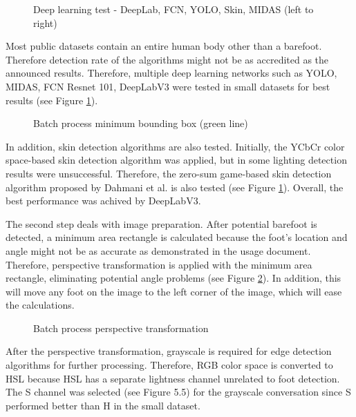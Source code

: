\begin{figure}[htbp]
\centering
{}
\caption{Deep learning test - DeepLab, FCN, YOLO, Skin, MIDAS (left to right)}
\label{fig:DeepLearningTest}
\end{figure}

Most public datasets contain an entire human body other than a barefoot. Therefore detection rate of the algorithms might not be as accredited as the announced results. Therefore, multiple deep learning networks such as YOLO, MIDAS, FCN Resnet 101, DeepLabV3 were tested in small datasets for best results (see Figure \ref{fig:DeepLearningTest}).

\begin{figure}[htbp]
\centering
{}
\caption{Batch process minimum bounding box (green line)}
\label{fig:BatchProcessMinimumBoundingBox}
\end{figure}

In addition, skin detection algorithms are also tested. Initially, the YCbCr color space-based skin detection algorithm was applied, but in some lighting detection results were unsuccessful. Therefore, the zero-sum game-based skin detection algorithm proposed by Dahmani et al. \cite{dahmani2020zero} is also tested (see Figure \ref{fig:DeepLearningTest}). Overall, the best performance was achived by DeepLabV3. 

The second step deals with image preparation. After  potential barefoot is detected, a minimum area rectangle is calculated because the foot's location and angle might not be as accurate as demonstrated in the usage document. Therefore, perspective transformation is applied with the minimum area rectangle, eliminating potential angle problems (see Figure \ref{fig:BatchProcessMinimumBoundingBox}). In addition, this will move any foot on the image to the left corner of the image, which will ease the calculations.

\begin{figure}[htbp]
\centering
{}
\caption{Batch process perspective transformation}
\label{fig:BatchProcessPerspectiveTransformation}
\end{figure}

After the perspective transformation, grayscale is required for edge detection algorithms for further processing. Therefore, RGB color space is converted to HSL because HSL has a separate lightness channel unrelated to foot detection. The S channel was selected (see Figure 5.5) for the grayscale conversation since S performed better than H in the small dataset.


